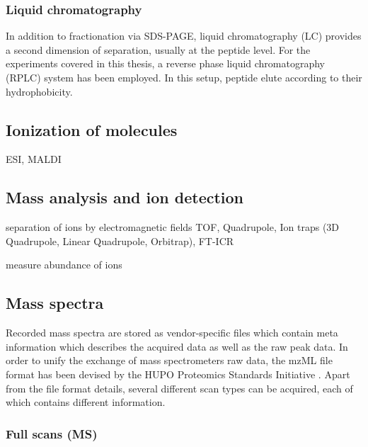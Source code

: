 \subsubsection{Liquid chromatography}

In addition to fractionation via SDS-PAGE, liquid chromatography (LC) provides 
a second dimension of separation, usually at the peptide level.
For the experiments covered in this thesis, a reverse phase liquid 
chromatography (RPLC) system has been employed.
In this setup, peptide elute according to their hydrophobicity.

\subsection{Ionization of molecules}

\begin{todo}
ESI, MALDI
\end{todo}

\subsection{Mass analysis and ion detection}

\begin{todo}
separation of ions by electromagnetic fields
TOF, Quadrupole, Ion traps (3D Quadrupole, Linear Quadrupole, Orbitrap), FT-ICR
\end{todo}

\begin{todo}
measure abundance of ions
\end{todo}

\subsection{Mass spectra}

Recorded mass spectra are stored as vendor-specific files which contain meta 
information which describes the acquired data as well as the raw peak data.
In order to unify the exchange of mass spectrometers raw data, the mzML file 
format has been devised by the HUPO Proteomics Standards Initiative
\citep{Deutsch2008}.
Apart from the file format details, several different scan types can be
acquired, each of which contains different information.

\subsubsection{Full scans (MS)}

